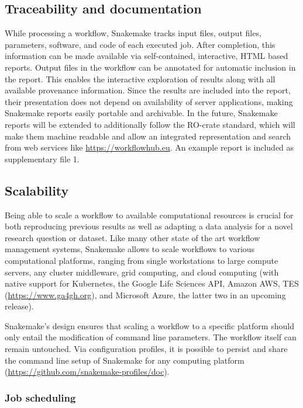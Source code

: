 \documentclass[parskip=half]{scrartcl}
\let\plainurl\url
\renewcommand{\url}[1]{\protect\plainurl{#1}}
\begin{document}
\subsection{Traceability and documentation}

While processing a workflow, Snakemake tracks input files, output files, parameters, software, and code of each executed job.
After completion, this information can be made available via self-contained, interactive, HTML based reports.
Output files in the workflow can be annotated for automatic inclusion in the report.
This enables the interactive exploration of results along with all available provenance information.
Since the results are included into the report, their presentation does not depend on availability of server applications, making Snakemake reports easily portable and archivable.
In the future, Snakemake reports will be extended to additionally follow the RO-crate standard, which will make them machine readable and allow an integrated representation and search from web services like \url{https://workflowhub.eu}.
An example report is included as supplementary file 1.

\subsection{Scalability}\label{sec:scalability}

Being able to scale a workflow to available computational resources is crucial for both reproducing previous results as well as adapting a data analysis for a novel research question or dataset.
Like many other state of the art workflow management systems, Snakemake allows to scale workflows to various computational platforms, ranging from single workstations to large compute servers, any cluster middleware, grid computing, and cloud computing (with native support for Kubernetes, the Google Life Sciences API, Amazon AWS, TES (\url{https://www.ga4gh.org}), and Microsoft Azure, the latter two in an upcoming release).

Snakemake's design ensures that scaling a workflow to a specific platform should only entail the modification of command line parameters.
The workflow itself can remain untouched.
Via configuration profiles, it is possible to persist and share the command line setup of Snakemake for any computing platform (\url{https://github.com/snakemake-profiles/doc}).

\subsubsection{Job scheduling}\label{sec:scheduling}
\end{document}
